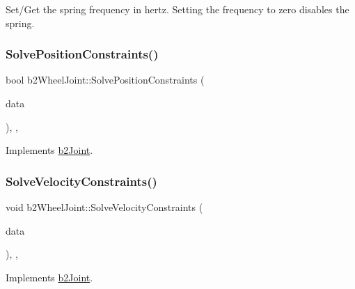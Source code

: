 Set/\+Get the spring frequency in hertz. Setting the frequency to zero disables the spring. 

\mbox{\label{classb2_wheel_joint_addbe70ee831954312bc31dee1d52311f}} 
\subsubsection{\texorpdfstring{SolvePositionConstraints()}{SolvePositionConstraints()}}
{\footnotesize\ttfamily bool b2\+Wheel\+Joint\+::\+Solve\+Position\+Constraints (\begin{DoxyParamCaption}\item[{const \mbox{\hyperlink{structb2_solver_data}{b2\+Solver\+Data}} \&}]{data }\end{DoxyParamCaption})\hspace{0.3cm}{\ttfamily [override]}, {\ttfamily [protected]}, {\ttfamily [virtual]}}



Implements \mbox{\hyperlink{classb2_joint_af767ac9aa494bd15cdf83dfe3e487d9c}{b2\+Joint}}.

\mbox{\label{classb2_wheel_joint_afbda202bc67d58cac38e3c5b138b93f7}} 
\subsubsection{\texorpdfstring{SolveVelocityConstraints()}{SolveVelocityConstraints()}}
{\footnotesize\ttfamily void b2\+Wheel\+Joint\+::\+Solve\+Velocity\+Constraints (\begin{DoxyParamCaption}\item[{const \mbox{\hyperlink{structb2_solver_data}{b2\+Solver\+Data}} \&}]{data }\end{DoxyParamCaption})\hspace{0.3cm}{\ttfamily [override]}, {\ttfamily [protected]}, {\ttfamily [virtual]}}



Implements \mbox{\hyperlink{classb2_joint_ad302c8d02efcfe934158de0dc429348d}{b2\+Joint}}.



